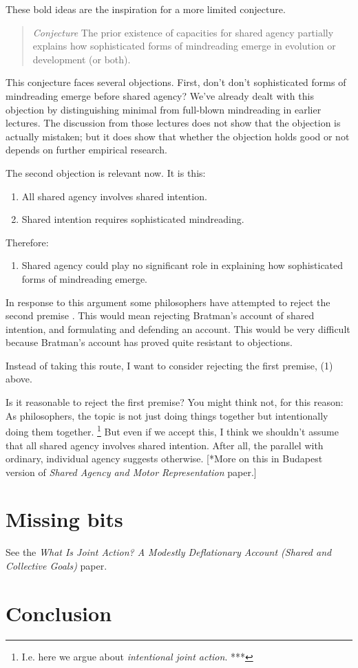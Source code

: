 \documentclass[12pt,\papersize]{extarticle}
\begin{document}
These bold ideas are the inspiration for a more limited conjecture.
%
\begin{quote}
\emph{Conjecture} 
The prior existence of capacities for shared agency partially explains how sophisticated forms of mindreading emerge in evolution or development (or both).
\end{quote}
%
This conjecture faces several objections.
First, don't don't sophisticated forms of mindreading emerge before shared agency?
We've already dealt with this objection by distinguishing minimal from full-blown mindreading in earlier lectures.
The discussion from those lectures does not show that the objection is actually mistaken; but it does show that whether the objection holds good or not depends on further empirical research.

The second objection is relevant now.  It is this:
\begin{enumerate}
\item 
	All shared agency involves shared intention.
\item 
	Shared intention requires sophisticated mindreading.
\end{enumerate}
%
Therefore:
%
\begin{enumerate}[resume]
\item 
	Shared agency could play no significant role in explaining how sophisticated forms of mindreading emerge.
\end{enumerate}
%
In response to this argument some philosophers have attempted to reject the second premise \citep[e.g.][]{Tollefsen:2005vh, Pacherie:2012fk}.   
This would mean rejecting Bratman's account of shared intention, and formulating and defending an account.
This would be very difficult because Bratman's account has proved quite resistant to objections.

Instead of taking this route,
I want to consider rejecting the first premise, (1) above.

Is it reasonable to reject the first premise?
You might think not, 
for this reason:
As philosophers, the topic is not just doing things together but intentionally doing them together.%
\footnote{
I.e. here we argue about \emph{intentional joint action}. ***
}
But even if we accept this, I think we shouldn’t assume that all shared agency involves shared intention.
After all, the parallel with ordinary, individual agency suggests otherwise.
[*More on this in Budapest version of \emph{Shared Agency and Motor Representation} paper.]


\section{Missing bits}
See the \emph{What Is Joint Action? A Modestly Deflationary Account (Shared and Collective Goals)} paper.


\section{Conclusion}




\small

\end{document}

